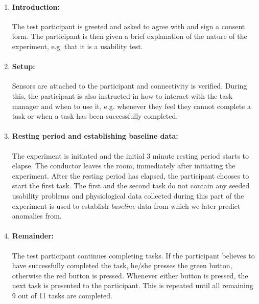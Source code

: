 \begin{enumerate}
\item \paragraph{Introduction:} The test participant is greeted and asked to agree with and sign a consent form. The
  participant is then given a brief explanation of the nature of the experiment, e.g. that it is a usability test.
\item \paragraph{Setup:} Sensors are attached to the participant and connectivity is verified. During this, the
  participant is also instructed in how to interact with the task manager and when to use it, e.g. whenever they feel
  they cannot complete a task or when a task has been successfully completed.
\item \paragraph{Resting period and establishing baseline data:} The experiment is initiated and the initial 3 minute
  resting period starts to elapse. The conductor leaves the room, immediately after initiating the experiment. After the
  resting period has elapsed, the participant chooses to start the first task. The first and the second task do not
  contain any seeded usability problems and physiological data collected during this part of the experiment is used to
  establish \textit{baseline} data from which we later predict anomalies from.
\item \paragraph{Remainder:} The test participant continues completing tasks. If the participant believes to have
  successfully completed the task, he/she presses the green button, otherwise the red button is pressed. Whenever either
  button is pressed, the next task is presented to the participant. This is repeated until all remaining 9 out of 11
  tasks are completed.
\end{enumerate}

